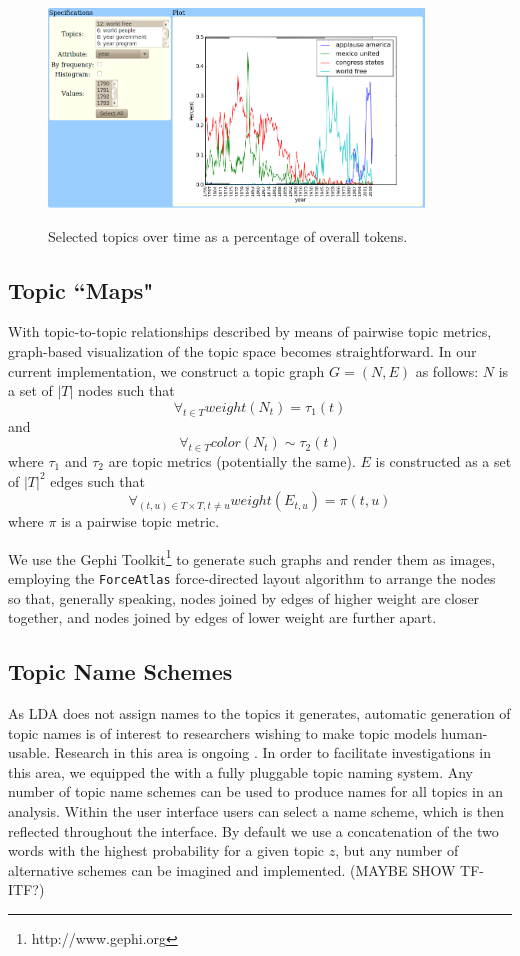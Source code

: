 \documentclass[11pt]{article}
\begin{document}
\begin{figure}[t]
 \centering
 \includegraphics[height=200px,keepaspectratio=true]{./topics_vs_years.png}
 \label{fig:chart}
 \caption{Selected topics over time as a percentage of overall tokens.}
\end{figure}

\subsection{Topic ``Maps"}
With topic-to-topic relationships described by means of pairwise topic metrics,
graph-based visualization of the topic space becomes straightforward. In our
current implementation, we construct a topic graph $G = (N, E)$ as follows:
$N$ is a set of $|T|$ nodes such that
\[\forall_{t\in T} weight(N_{t}) = \tau_{1}(t)\]
and
\[\forall_{t\in T} color(N_{t}) \sim \tau_{2}(t)\]
where $\tau_1$ and $\tau_2$ are topic metrics (potentially the same). $E$ is
constructed as a set of $|T|^2$ edges such that
  \[\forall_{(t,u)\in T\times T, t\neq u} weight(E_{t,u}) = \pi(t,u)\]
where $\pi$ is a pairwise topic metric.

We use the Gephi Toolkit\footnote{http://www.gephi.org} to generate such graphs
and render them as images, employing the \texttt{ForceAtlas} force-directed
layout algorithm to arrange the nodes so that, generally speaking, nodes joined
by edges of higher weight are closer together, and nodes joined by edges of
lower weight are further apart.


\subsection{Topic Name Schemes}
As LDA does not assign names to the topics it generates, automatic generation of
topic names is of interest to researchers wishing to make topic models
human-usable. Research in this area is ongoing \cite{Mei2007,Lau2010}. In order to
facilitate investigations in this area, we equipped the \tool{} with a
fully pluggable topic naming system. Any number of topic name schemes can be
used to produce names for all topics in an analysis. Within the user interface
users can select a name scheme, which is then reflected throughout the
interface. By default we use a concatenation of the two
words with the highest probability for a given topic $z$, but any number of
alternative schemes can be imagined and implemented. (MAYBE SHOW TF-ITF?)
\end{document}
